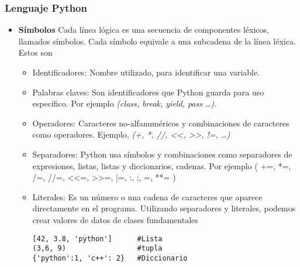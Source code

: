 \documentclass[10pt]{beamer}
\begin{document}
\begin{frame}[fragile]
\frametitle{Lenguaje Python}

\begin{itemize}
\item \textbf{S\'imbolos} Cada l\'inea l\'ogica es una secuencia de componentes l\'exicos, llamados s\'imbolos. Cada s\'imbolo equivale a una subcadena de la l\'inea l\'exica. Estos son

\vspace{0.2cm}

\begin{itemize}
\item Identificadores: Nombre  utilizado, para identificar una variable.
\item Palabras claves: Son identificadores que Python guarda para uso espec\'ifico. Por ejemplo \textit{(class, break, yield, pass \dots)}.
\item Operadores: Caracteres no-alfanum\'ericos y combinaciones de caracteres como operadores. Ejemplo, \textit{(+, *, //,  <<, >>, !=, \dots)}
\item Separadores: Python usa s\'imbolos y combinaciones como separadores de expresiones, listas, listas y diccionarios, cadenas. Por ejemplo  ( +=, *=, /=, //=, <<=, >>=, |=, :, ;, =,  **= )
\item Literales: Es un n\'umero o una cadena de caracteres que aparece directamente en el programa. Utilizando separadores y literales, podemos crear valores de datos de clases fundamentales

\vspace{0.3cm}

\begin{lstlisting}
[42, 3.8, 'python']      #Lista
(3,6, 9)                 #tupla
{'python':1, 'c++': 2}   #Diccionario
\end{lstlisting}
\end{itemize}
\end{itemize}
\end{frame}
\end{document}
